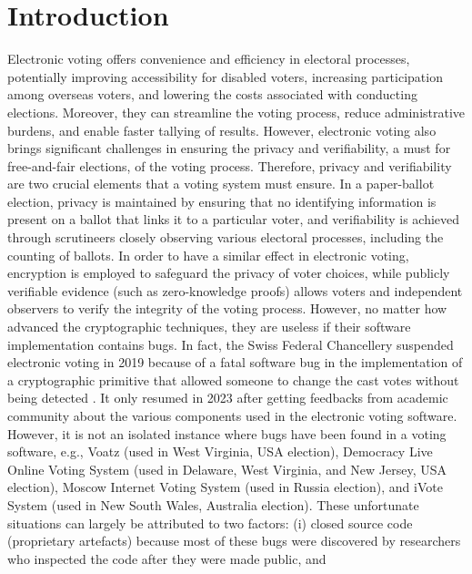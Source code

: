 \documentclass[sigconf,anonymous,review]{acmart}
\begin{document}
\section{Introduction}
Electronic voting offers convenience and efficiency in electoral processes, potentially improving 
accessibility for disabled voters, increasing participation among overseas voters, and lowering 
the costs associated with conducting elections. Moreover,
they can streamline the voting process, reduce administrative burdens, and enable 
faster tallying of results. However, electronic voting also brings significant 
challenges in ensuring the privacy and verifiability, a must for free-and-fair elections, of the voting process. Therefore, 
privacy and verifiability are two crucial elements that a voting system must ensure.
In a paper-ballot election, privacy is maintained by 
ensuring that no identifying information is present on a ballot that links it to a particular voter, 
and verifiability is achieved through scrutineers closely observing various electoral processes, 
including the counting of ballots. In order to have a similar effect in electronic voting, encryption 
is employed to safeguard the privacy of voter choices, while publicly verifiable evidence 
(such as zero-knowledge proofs) allows voters and independent observers to verify the integrity of 
the voting process. However, no matter how advanced the cryptographic techniques, they are useless 
if their software implementation contains bugs. In fact, 
the Swiss Federal Chancellery suspended electronic voting in 2019 because of 
a fatal software bug in the implementation of a cryptographic primitive 
that allowed someone to change the cast votes without being detected \cite{9152765}.
It only resumed in 2023 after getting feedbacks from academic 
community \cite{swiss_evoting_chronik} about the various components used in 
the electronic voting software. However, it is not an isolated  
instance where bugs have been found in a voting software, e.g., 
Voatz \cite{255334} (used in West Virginia, USA election),
Democracy Live Online Voting System \cite{263858} 
(used in Delaware, West Virginia, and New Jersey, USA election), 
Moscow Internet Voting System \cite{10.1007/978-3-030-51280-4_3}
(used in Russia election), and iVote System \cite{10.1007/978-3-319-22270-7_3, 10.1145/3014812.3014837} 
(used in New South Wales, Australia election). 
These unfortunate situations can largely be attributed to two factors: 
(i) closed source code (proprietary artefacts) because most of these bugs were 
discovered by researchers who inspected the code after they were made public, and 
\end{document}

